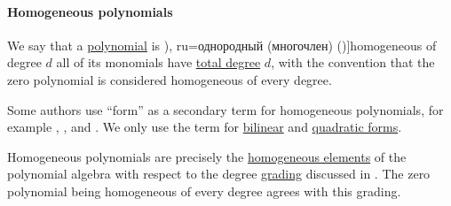 \paragraph{Homogeneous polynomials}

\begin{definition}\label{def:homogeneous_polynomial}
  We say that a \hyperref[def:polynomial_algebra]{polynomial} is \term[bg=хомогенен (полином) (\cite[58]{ГеновМиховскиМоллов1991Алгебра}), ru=однородный (многочлен) (\cite[314]{Курош1968ВысшаяАлгебра})]{homogeneous} of degree \( d \) all of its monomials have \hyperref[def:polynomial_degree]{total degree} \( d \), with the convention that the zero polynomial is considered homogeneous of every degree.
\end{definition}
\begin{comments}
  \item Some authors use \enquote{form} as a secondary term for homogeneous polynomials, for example , ,  and . We only use the term for \hyperref[def:bilinear_form]{bilinear} and \hyperref[def:quadratic_form]{quadratic forms}.

  \item Homogeneous polynomials are precisely the \hyperref[def:homogeneous_element]{homogeneous elements} of the polynomial algebra with respect to the degree \hyperref[def:algebra_grading]{grading} discussed in . The zero polynomial being homogeneous of every degree agrees with this grading.
\end{comments}

